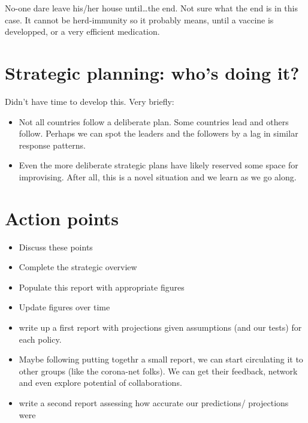\documentclass[
  english,
  ,doc,floatsintext]{apa6}
\providecommand{\tightlist}{%
  \setlength{\itemsep}{0pt}\setlength{\parskip}{0pt}}
\begin{document}
No-one dare leave his/her house until\ldots the end. Not sure what the end is in this case. It cannot be herd-immunity so it probably means, until a vaccine is developped, or a very efficient medication.

\hypertarget{strategic-planning-whos-doing-it}{%
\section{Strategic planning: who's doing it?}\label{strategic-planning-whos-doing-it}}

Didn't have time to develop this. Very briefly:

\begin{itemize}
\tightlist
\item
  Not all countries follow a deliberate plan. Some countries lead and others follow. Perhaps we can spot the leaders and the followers by a lag in similar response patterns.
\item
  Even the more deliberate strategic plans have likely reserved some space for improvising. After all, this is a novel situation and we learn as we go along.
\end{itemize}

\hypertarget{action-points}{%
\section{Action points}\label{action-points}}

\begin{itemize}
\item
  Discuss these points
\item
  Complete the strategic overview
\item
  Populate this report with appropriate figures
\item
  Update figures over time
\item
  write up a first report with projections given assumptions (and our tests) for each policy.
\item
  Maybe following putting togethr a small report, we can start circulating it to other groups (like the corona-net folks). We can get their feedback, network and even explore potential of collaborations.
\item
  write a second report assessing how accurate our predictions/ projections were
\end{itemize}
\end{document}
